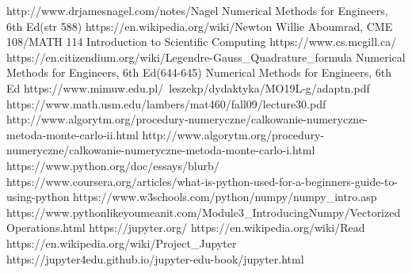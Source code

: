 \documentclass[12pt,twoside]{article}
\begin{document}
\begin{thebibliography}{4}
 http://www.drjamesnagel.com/notes/Nagel%
 Numerical Methods for Engineers, 6th Ed(str 588)
 https://en.wikipedia.org/wiki/Newton%
 Willie Aboumrad, CME 108/MATH 114 Introduction to Scientific Computing
 https://www.cs.mcgill.ca/
 https://en.citizendium.org/wiki/Legendre-Gauss\_Quadrature\_formula
 Numerical Methods for Engineers, 6th Ed(644-645)
 Numerical Methods for Engineers, 6th Ed
 https://www.mimuw.edu.pl/~leszekp/dydaktyka/MO19L-g/adaptn.pdf
 https://www.math.usm.edu/lambers/mat460/fall09/lecture30.pdf
 http://www.algorytm.org/procedury-numeryczne/calkowanie-numeryczne-metoda-monte-carlo-ii.html
 http://www.algorytm.org/procedury-numeryczne/calkowanie-numeryczne-metoda-monte-carlo-i.html
 https://www.python.org/doc/essays/blurb/
 https://www.coursera.org/articles/what-is-python-used-for-a-beginners-guide-to-using-python
 https://www.w3schools.com/python/numpy/numpy\_intro.asp
 https://www.pythonlikeyoumeanit.com/Module3\_IntroducingNumpy/VectorizedOperations.html
 https://jupyter.org/
 https://en.wikipedia.org/wiki/Read%
 https://en.wikipedia.org/wiki/Project\_Jupyter
 https://jupyter4edu.github.io/jupyter-edu-book/jupyter.html
\end{thebibliography}

\clearpage

\makesummary
\end{document}
